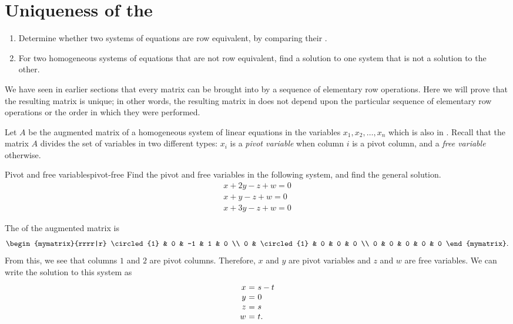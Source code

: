 \section{Uniqueness of the {\rref}}

\begin{outcome}
  \begin{enumerate}
  \item Determine whether two systems of equations are row equivalent,
    by comparing their {\rref}.
  \item For two homogeneous systems of equations that are not row
    equivalent, find a solution to one system that is not a solution
    to the other.
  \end{enumerate}
\end{outcome}

We have seen in earlier sections that every matrix can be brought into
{\rref} by a sequence of elementary row operations. Here we will prove
that the resulting matrix is unique; in other words, the resulting
matrix in {\rref} does not depend upon the particular sequence of
elementary row operations or the order in which they were performed.

Let $A$ be the augmented matrix of a homogeneous system of linear
equations in the variables $x_1, x_2,\ldots, x_n$ which is also in
{\rref}. Recall that the matrix $A$ divides the set of variables in
two different types: $x_i$ is a
{\em pivot variable} when column $i$ is a pivot
column, and a {\em free variable} otherwise.

\begin{example}{Pivot and free variables}{pivot-free}
Find the pivot and free variables in the following system, and find
the general solution.
\[
\begin{array}{c}
x+2y-z+w=0 \\
x+y-z+w=0 \\
x+3y-z+w=0
\end{array}
\]
\end{example}

\begin{solution}
The {\rref} of the augmented matrix is
\[
\begin{mymatrix}{rrrr|r}
\circled{1} & 0 & -1 & 1 & 0 \\
0 & \circled{1} & 0 & 0 & 0 \\
0 & 0 & 0 & 0 & 0
\end{mymatrix}.
\]
From this, we see that columns $1$ and $2$ are pivot
columns. Therefore, $x$ and $y$ are pivot variables and $z$ and $w$
are free variables. We can write the solution to this system as
\[
\begin{array}{r@{~}c@{~}l}
x &=& s-t \\
y &=& 0 \\
z &=& s \\
w &=& t.
\end{array}
\]
\end{solution}

